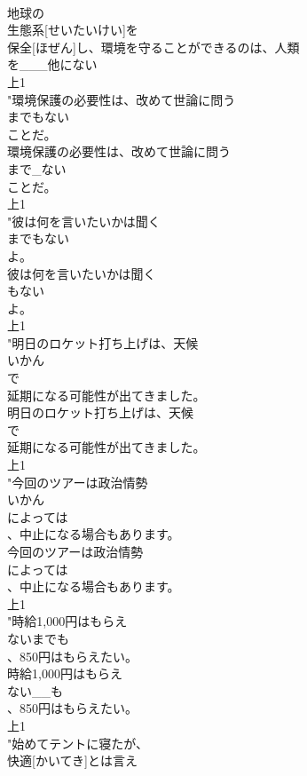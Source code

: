 \documentclass[8pt]{extreport}
\begin{document}
\begin{CJK}{UTF8}{min}
\\	地球の
\\	生態系[せいたいけい]を
\\	保全[ほぜん]し、環境を守ることができるのは、人類
\\	を___他にない
\\	上1
\\	"環境保護の必要性は、改めて世論に問う
\\	までもない
\\	ことだ。
\\	環境保護の必要性は、改めて世論に問う
\\	まで_ない
\\	ことだ。
\\	上1
\\	"彼は何を言いたいかは聞く
\\	までもない
\\	よ。
\\	彼は何を言いたいかは聞く
\\	もない
\\	よ。
\\	上1
\\	"明日のロケット打ち上げは、天候
\\	いかん
\\	で
\\	延期になる可能性が出てきました。
\\	明日のロケット打ち上げは、天候
\\	で
\\	延期になる可能性が出てきました。
\\	上1
\\	"今回のツアーは政治情勢
\\	いかん
\\	によっては
\\	、中止になる場合もあります。
\\	今回のツアーは政治情勢
\\	によっては
\\	、中止になる場合もあります。
\\	上1
\\	"時給1,000円はもらえ
\\	ないまでも
\\	、850円はもらえたい。
\\	時給1,000円はもらえ
\\	ない__も
\\	、850円はもらえたい。
\\	上1
\\	"始めてテントに寝たが、
\\	快適[かいてき]とは言え

\end{CJK}
\end{document}
